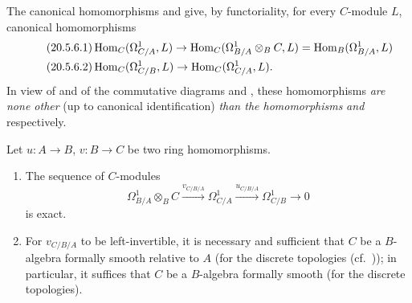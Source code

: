 \begin{env}[20.5.6]
\label{0.20.5.6}
The canonical homomorphisms  and  give, by functoriality, for every $C$-module $L$, canonical homomorphisms
\begin{align}
\tag{20.5.6.1}
  \label{0.20.5.6.1}
  &\operatorname{Hom}_C(\Omega^1_{C/A},L)\to\operatorname{Hom}_C(\Omega^1_{B/A}\otimes_B C,L)=\operatorname{Hom}_B(\Omega^1_{B/A},L) \\
\tag{20.5.6.2}
  \label{0.20.5.6.2}
  &\operatorname{Hom}_C(\Omega^1_{C/B},L)\to\operatorname{Hom}_C(\Omega^1_{C/A},L).
\end{align}
In view of  and of the commutative diagrams  and , these homomorphisms \emph{are none other} (up to canonical identification) \emph{than the homomorphisms}  \emph{and}  respectively.
\end{env}

\begin{theorem}[20.5.7]
\label{0.20.5.7}
Let $u:A\to B$, $v:B\to C$ be two ring homomorphisms.
\begin{enumerate}
  \item[\rm(i)] The sequence of $C$-modules
\begin{equation}
\tag{20.5.7.1}
  \label{0.20.5.7.1}
  \Omega^1_{B/A}\otimes_B C\xrightarrow{v_{C/B/A}}\Omega^1_{C/A}\xrightarrow{u_{C/B/A}}\Omega^1_{C/B}\to 0
\end{equation}
is exact.
  \item[\rm(ii)] For $v_{C/B/A}$ to be left-invertible, it is necessary and sufficient that $C$ be a $B$-algebra formally smooth relative to $A$ \textup{(}for the discrete topologies \textup{(}cf.\ \textup{))}; in particular, it suffices that $C$ be a $B$-algebra formally smooth \textup{(}for the discrete topologies\textup{)}.
\end{enumerate}
\end{theorem}


